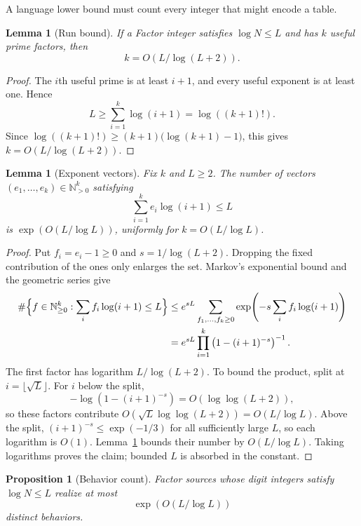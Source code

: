 \documentclass[11pt]{article}
\newtheorem{lemma}[theorem]{Lemma}
\newtheorem{proposition}[theorem]{Proposition}
\theoremstyle{remark}
\newcommand{\N}{\mathbb N}
\begin{document}
A language lower bound must count every integer that might encode a table.

\begin{lemma}[Run bound]\label{lem:runs}
If a Factor integer satisfies $\log N\le L$ and has $k$ useful prime factors,
then
\[
  k=O(L/\log(L+2)).
\]
\end{lemma}

\begin{proof}
The $i$th useful prime is at least $i+1$, and every useful exponent is at
least one.  Hence
\[
  L\ge\sum_{i=1}^{k}\log(i+1)=\log((k+1)!).
\]
Since $\log((k+1)!)\ge(k+1)\bigl(\log(k+1)-1\bigr)$, this gives
$k=O(L/\log(L+2))$.
\end{proof}

\begin{lemma}[Exponent vectors]\label{lem:vectors}
Fix $k$ and $L\ge2$.  The number of vectors
$(e_1,\ldots,e_k)\in\N_{>0}^k$ satisfying
\begin{equation}\label{eq:budget}
  \sum_{i=1}^{k}e_i\log(i+1)\le L
\end{equation}
is $\exp(O(L/\log L))$, uniformly for
$k=O(L/\log L)$.
\end{lemma}

\begin{proof}
Put $f_i=e_i-1\ge0$ and $s=1/\log(L+2)$.  Dropping the fixed contribution
of the ones only enlarges the set.  Markov's exponential bound and the
geometric series give
\begin{align*}
 \#\Bigl\{f\in\N_{\ge0}^k:\sum_if_i\log(i+1)\le L\Bigr\}
 &\le e^{sL}
       \sum_{f_1,\ldots,f_k\ge0}
       \exp\!\left(-s\sum_i f_i\log(i+1)\right)\\
 &=e^{sL}\prod_{i=1}^{k}
       \left(1-(i+1)^{-s}\right)^{-1}.
\end{align*}
The first factor has logarithm $L/\log(L+2)$.  To bound the product, split
at $i=\lfloor\sqrt L\rfloor$.  For $i$ below the split,
\[
 -\log\left(1-(i+1)^{-s}\right)=O(\log\log(L+2)),
\]
so these factors contribute
$O(\sqrt L\log\log(L+2))=O(L/\log L)$.  Above the split,
$(i+1)^{-s}\le\exp(-1/3)$ for all sufficiently large $L$, so each logarithm
is $O(1)$.  Lemma~\ref{lem:runs} bounds their number by $O(L/\log L)$.
Taking logarithms proves the claim; bounded $L$ is absorbed in the constant.
\end{proof}

\begin{proposition}[Behavior count]\label{prop:count}
Factor sources whose digit integers satisfy $\log N\le L$ realize at most
\[
  \exp(O(L/\log L))
\]
distinct behaviors.
\end{proposition}
\end{document}
